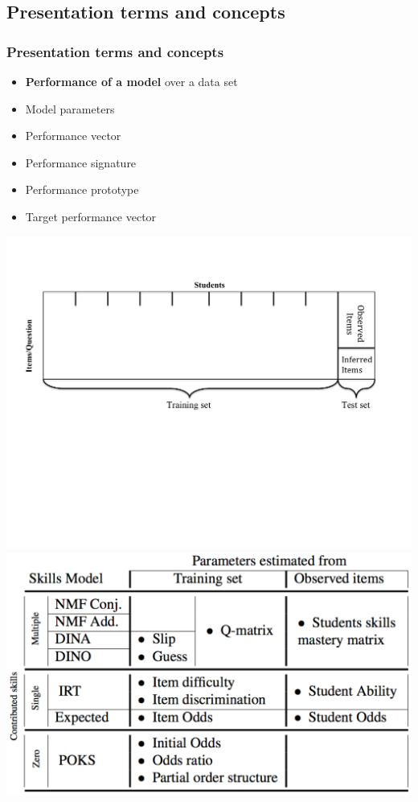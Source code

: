\documentclass{beamer}
\begin{document}
\subsection{Presentation terms and concepts}
\begin{frame}\frametitle{Presentation terms and concepts}
\begin{itemize}
\item<1-> \textbf{Performance of a model} over a data set
\item<2-> Model parameters
\item<3-> Performance vector
\item<3-> Performance signature
\item<4-> Performance prototype
\item<5-> Target performance vector
\end{itemize}
\begin{overprint}
\vspace{-2cm}
 \centering \includegraphics[trim=0cm 8.5cm 2.4cm 2.4cm,clip=true,width=\textwidth]{images/Methodology.pdf}
 \vspace{1cm} \centering \includegraphics[width=.7\textwidth]{images/Parameters-Model}

\end{overprint}
\end{frame}
\end{document}
